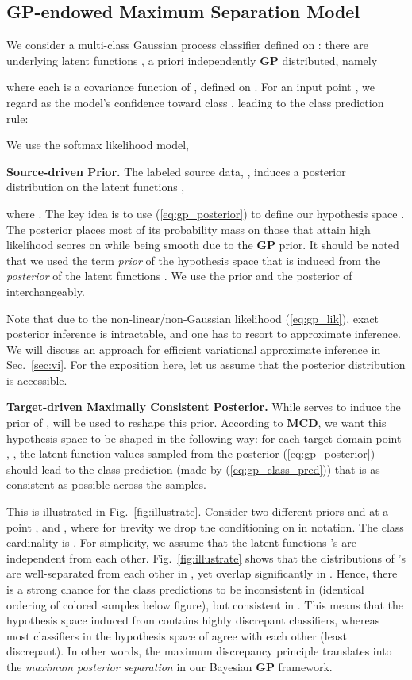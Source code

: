 \documentclass[10pt,letterpaper]{article}
\begin{document}
\subsection{GP-endowed Maximum Separation Model}

We consider a multi-class Gaussian process classifier defined on : there are  underlying latent functions , a priori independently \textbf {GP} distributed, namely 

where each  is a covariance function of , defined on . 
For an input point , we regard  as the model's confidence toward class , leading to the class prediction rule:
\vspace{+0.5em}

We use the softmax likelihood model, 


\noindent\textbf{Source-driven  Prior.} The labeled source data, , induces a posterior distribution on the latent functions , 

where . The key idea is to use (\ref{eq:gp_posterior}) to define our hypothesis space . The posterior places most of its probability mass on those  that attain high likelihood scores on  while being smooth due to the \textbf {GP} prior.  It should be noted that we used the term {\em prior} of the hypothesis space  that is induced from the {\em posterior} of the latent functions . We use the  prior and the posterior of  interchangeably.

Note that due to the non-linear/non-Gaussian likelihood (\ref{eq:gp_lik}), exact posterior inference is intractable, and one has to resort to  approximate inference. We will discuss an approach for efficient variational approximate inference in Sec.~\ref{sec:vi}. For the exposition here, let us assume that the posterior distribution is accessible. 



\noindent\textbf{Target-driven Maximally Consistent Posterior.} While  serves to induce the prior of ,  will be used to reshape this prior.  According to \textbf{MCD}, we want this hypothesis space to be shaped in the following way: for each target domain point , , the latent function values  sampled from the posterior (\ref{eq:gp_posterior}) should lead to the class prediction (made by (\ref{eq:gp_class_pred})) that is as consistent as possible across the samples. 

This is illustrated in Fig.~\ref{fig:illustrate}. Consider two different  priors  and  at a point ,   and , where for brevity we drop the conditioning on  in notation. The class cardinality is . For simplicity, we assume that the latent functions 's are independent from each other. Fig.~\ref{fig:illustrate} shows that the distributions of 's are well-separated from each other in , yet overlap significantly in . Hence, there is a strong chance for the class predictions to be inconsistent in  (identical ordering of colored samples below figure), but consistent in . This means that the hypothesis space induced from  contains highly discrepant classifiers, whereas most classifiers in the hypothesis space of  agree with each other (least discrepant). In other words, the maximum discrepancy principle translates into the {\em maximum posterior separation} in our Bayesian \textbf {GP} framework. 
\end{document}
